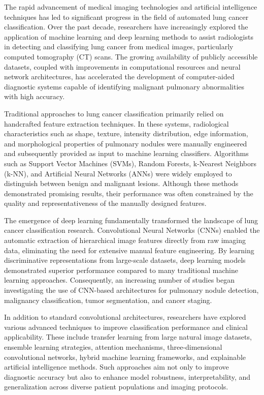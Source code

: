 The rapid advancement of medical imaging technologies and artificial intelligence techniques has led to significant progress in the field of automated lung cancer classification. Over the past decade, researchers have increasingly explored the application of machine learning and deep learning methods to assist radiologists in detecting and classifying lung cancer from medical images, particularly computed tomography (CT) scans. The growing availability of publicly accessible datasets, coupled with improvements in computational resources and neural network architectures, has accelerated the development of computer-aided diagnostic systems capable of identifying malignant pulmonary abnormalities with high accuracy.

Traditional approaches to lung cancer classification primarily relied on handcrafted feature extraction techniques. In these systems, radiological characteristics such as shape, texture, intensity distribution, edge information, and morphological properties of pulmonary nodules were manually engineered and subsequently provided as input to machine learning classifiers. Algorithms such as Support Vector Machines (SVMs), Random Forests, k-Nearest Neighbors (k-NN), and Artificial Neural Networks (ANNs) were widely employed to distinguish between benign and malignant lesions. Although these methods demonstrated promising results, their performance was often constrained by the quality and representativeness of the manually designed features.

The emergence of deep learning fundamentally transformed the landscape of lung cancer classification research. Convolutional Neural Networks (CNNs) enabled the automatic extraction of hierarchical image features directly from raw imaging data, eliminating the need for extensive manual feature engineering. By learning discriminative representations from large-scale datasets, deep learning models demonstrated superior performance compared to many traditional machine learning approaches. Consequently, an increasing number of studies began investigating the use of CNN-based architectures for pulmonary nodule detection, malignancy classification, tumor segmentation, and cancer staging.

In addition to standard convolutional architectures, researchers have explored various advanced techniques to improve classification performance and clinical applicability. These include transfer learning from large natural image datasets, ensemble learning strategies, attention mechanisms, three-dimensional convolutional networks, hybrid machine learning frameworks, and explainable artificial intelligence methods. Such approaches aim not only to improve diagnostic accuracy but also to enhance model robustness, interpretability, and generalization across diverse patient populations and imaging protocols.

